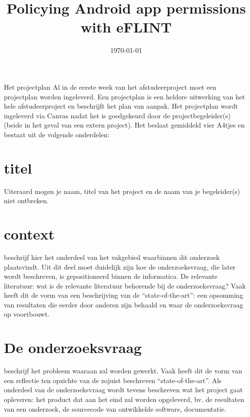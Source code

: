 \documentclass{uva-inf-article}
\title{Policying Android app permissions with eFLINT}
\date{\today}
\begin{document}
\maketitle




Het projectplan
Al in de eerste week van het afstudeerproject moet een projectplan worden ingeleverd. Een
projectplan is een heldere uitwerking van het hele afstudeerproject en beschrijft het plan van
aanpak. Het projectplan wordt ingeleverd via Canvas nadat het is goedgekeurd door de
projectbegeleider(s) (beide in het geval van een extern project). Het beslaat gemiddeld vier
A4tjes en bestaat uit de volgende onderdelen:
\section{titel}
Uiteraard mogen je naam, titel van het project en de naam van je begeleider(s) niet
ontbreken.
\section{context}
beschrijf hier het onderdeel van het vakgebied waarbinnen dit onderzoek
plaatsvindt. Uit dit deel moet duidelijk zijn hoe de onderzoeksvraag, die later wordt
beschreven, is gepositioneerd binnen de informatica.
De relevante literatuur: wat is de relevante literatuur behorende bij de
onderzoeksvraag? Vaak heeft dit de vorm van een beschrijving van de “state-of-the-art”:
een opsomming van resultaten die eerder door anderen zijn behaald en waar de
onderzoeksvraag op voortbouwt.
\section{De onderzoeksvraag}
beschrijf het probleem waaraan zal worden gewerkt. Vaak heeft
dit de vorm van een reflectie ten opzichte van de zojuist beschreven “state-of-the-art”.
Als onderdeel van de onderzoeksvraag wordt tevens beschreven wat het project gaat
opleveren: het product dat aan het eind zal worden opgeleverd, bv. de resultaten van
een onderzoek, de sourcecode van ontwikkelde software, documentatie.
\end{document}
